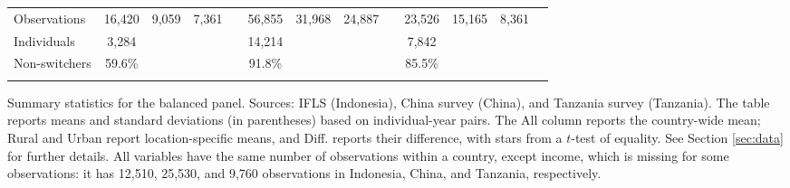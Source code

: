 \begin{table}[htbp]
\begin{threeparttable}
\begin{tabular}{l cccc cccc cccc}
\cmidrule(lr){2-13}
Observations & 16,420 & 9,059 & 7,361 &  & 56,855 & 31,968 & 24,887 &  & 23,526 & 15,165 & 8,361 &  \\  \addlinespace
Individuals & 3,284 &  &  &  & 14,214 &  &  &  & 7,842 &  &  &  \\
Non-switchers &   59.6\% &  &  &  &   91.8\% &  &  &  &   85.5\% &  &  &  \\  \addlinespace
\bottomrule \end{tabular} \begin{tablenotes}[flushleft] \footnotesize \item{Summary statistics for the balanced panel. Sources: IFLS (Indonesia), China survey (China), and Tanzania survey (Tanzania). The table reports means and standard deviations (in parentheses) based on individual-year pairs. The All column reports the country-wide mean; Rural and Urban report location-specific means, and Diff. reports their difference, with stars from a $t$-test of equality. See Section \ref{sec:data} for further details. All variables have the same number of observations within a country, except income, which is missing for some observations: it has 12,510, 25,530, and 9,760 observations in Indonesia, China, and Tanzania, respectively.}
\end{tablenotes}
\end{threeparttable} \end{table}
